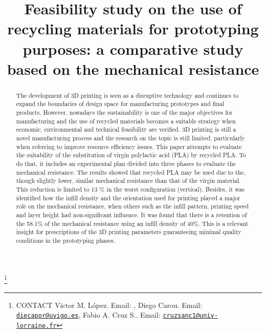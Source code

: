 \documentclass[]{interact}
\theoremstyle{plain}%
\theoremstyle{definition}
\theoremstyle{remark}
\begin{document}
\articletype{}

\title{Feasibility study on the use of recycling materials for
prototyping purposes: a comparative study based on the mechanical
resistance}


\author{
}

\thanks{CONTACT Victor M. López. Email: , Diego
Carou. Email: \href{mailto:diecapor@uvigo.es}{\nolinkurl{diecapor@uvigo.es}}, Fabio
A. Cruz
S.. Email: \href{mailto:cruzsanc1@univ-lorraine.fr}{\nolinkurl{cruzsanc1@univ-lorraine.fr}}}

\maketitle

\begin{abstract}
The development of 3D printing is seen as a disruptive technology and
continues to expand the boundaries of design space for manufacturing
prototypes and final products. However, nowadays the sustainability is
one of the major objectives for manufacturing and the use of recycled
materials becomes a suitable strategy when economic, environmental and
technical feasibility are verified. 3D printing is still a novel
manufacturing process and the research on the topic is still limited,
particularly when referring to improve resource efficiency issues. This
paper attempts to evaluate the suitability of the substitution of virgin
polylactic acid (PLA) by recycled PLA. To do that, it includes an
experimental plan divided into three phases to evaluate the mechanical
resistance. The results showed that recycled PLA may be used due to the,
though slightly lower, similar mechanical resistance than that of the
virgin material. This reduction is limited to 13 \% in the worst
configuration (vertical). Besides, it was identified how the infill
density and the orientation used for printing played a major role on the
mechanical resistance, when others such as the infill pattern, printing
speed and layer height had non-significant influence. It was found that
there is a retention of the 58.1\% of the mechanical resistance using an
infill density of 40\%. This is a relevant insight for prescriptions of
the 3D printing parameters guaranteeing minimal quality conditions in
the prototyping phases.
\end{abstract}
\end{document}
